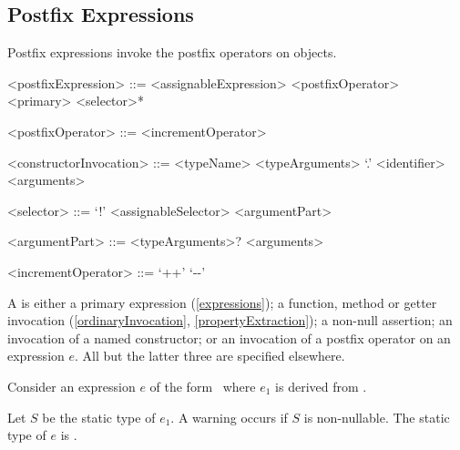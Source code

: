 \documentclass[makeidx]{article}
\begin{document}




\subsection{Postfix Expressions}

\LMHash{}%
Postfix expressions invoke the postfix operators on objects.

\begin{grammar}
<postfixExpression> ::= <assignableExpression> <postfixOperator>
  \alt <primary> <selector>*

<postfixOperator> ::= <incrementOperator>

<constructorInvocation> ::= \gnewline{}
  <typeName> <typeArguments> `.' <identifier> <arguments>

<selector> ::= `!'
  \alt <assignableSelector>
  \alt <argumentPart>

<argumentPart> ::=
  <typeArguments>? <arguments>

<incrementOperator> ::= `++'
  \alt `-\mbox-'
\end{grammar}

\LMHash{}%
A  is either a primary expression
(\ref{expressions});
a function, method or getter invocation
(\ref{ordinaryInvocation}, \ref{propertyExtraction});
a non-null assertion;
an invocation of a named constructor;
or an invocation of a postfix operator on an expression $e$.
All but the latter three are specified elsewhere.

\LMHash{}%
Consider an expression $e$ of the form \ where
$e_1$ is derived from .

\LMHash{}%
Let $S$ be the static type of $e_1$.
A warning occurs if $S$ is non-nullable.
The static type of $e$ is .
\end{document}
